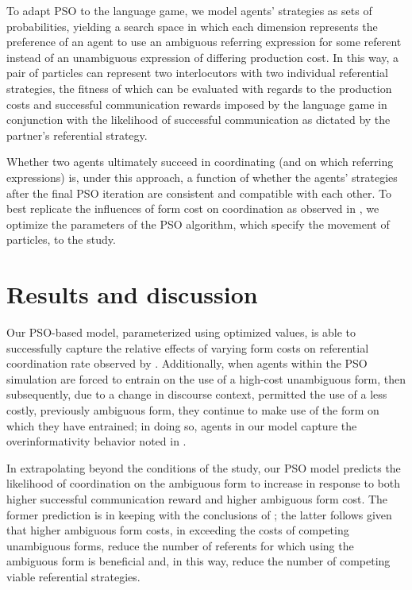 \documentclass[a4paper,11pt]{article}
\begin{document}
To adapt PSO to the \citeauthor{rohde2012} language game, we model agents' strategies as sets of probabilities, yielding a search space in which each dimension represents the preference of an agent to use an ambiguous referring expression for some referent instead of an unambiguous expression of differing production cost. In this way, a pair of particles can represent two interlocutors with two individual referential strategies, the fitness of which can be evaluated with regards to the production costs and successful communication rewards imposed by the language game in conjunction with the likelihood of successful communication as dictated by the partner's referential strategy. 

Whether two agents ultimately succeed in coordinating (and on which referring expressions) is, under this approach, a function of whether the agents' strategies after the final PSO iteration are consistent and compatible with each other. To best replicate the influences of form cost on coordination as observed in \citeauthor{rohde2012}, we optimize the parameters of the PSO algorithm, which specify the movement of particles, to the study.

\section{Results and discussion}
Our PSO-based model, parameterized using optimized values, is able to successfully capture the relative effects of varying form costs on referential coordination rate observed by \citeauthor{rohde2012}. Additionally, when agents within the PSO simulation are forced to entrain on the use of a high-cost unambiguous form, then subsequently, due to a change in discourse context, permitted the use of a less costly, previously ambiguous form, they continue to make use of the form on which they have entrained; in doing so, agents in our model capture the overinformativity behavior noted in \citeauthor{brennan1996}.

In extrapolating beyond the conditions of the \citeauthor{rohde2012} study, our PSO model predicts the likelihood of coordination on the ambiguous form to increase in response to both higher successful communication reward and higher ambiguous form cost. The former prediction is in keeping with the conclusions of \citeauthor{rohde2012}; the latter follows given that higher ambiguous form costs, in exceeding the costs of competing unambiguous forms, reduce the number of referents for which using the ambiguous form is beneficial and, in this way, reduce the number of competing viable referential strategies. 
\end{document}
